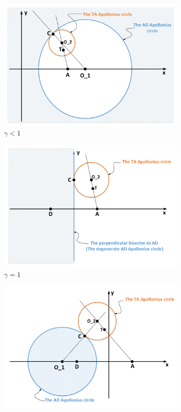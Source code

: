 \documentclass[final,5p,times,twocolumn]{elsarticle}
\begin{document}
\begin{figure}
\centering
\begin{subfigure}[b]{0.3\textwidth}
\includegraphics[width=\textwidth]{drawing4_2a.pdf}
\caption {$\gamma<1$}
\label{4_g<1}
\end{subfigure}
\quad
\begin{subfigure}[b]{0.3\textwidth}
\includegraphics[width=\textwidth]{drawing4_2c.pdf}
\caption {$\gamma=1$}
\label{4_g=1}
\end{subfigure}
\quad
\begin{subfigure}[b]{0.3\textwidth}
\includegraphics[width=\textwidth]{drawing4_2b.pdf}

\end{subfigure}
\end{figure}
\end{document}
